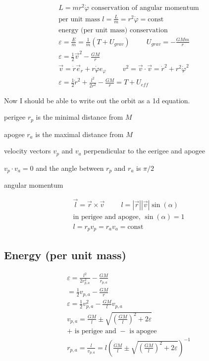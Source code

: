 \documentclass[fleqn]{report}
\newcommand{\hp}{\hspace{1cm}}
\newcommand{\const}{\textrm{const}}
\newcommand{\equations} [1] {
\begin{gather*}
#1
\end{gather*}
}
\begin{document}
\equations{
    L = m r^2 \dot \varphi \textrm{ conservation of angular momentum}
    \\
    \textrm{per unit mass } l = \frac{L}{m} = r^2 \dot \varphi = \const 
    \\
    \textrm{energy (per unit mass) conservation}
    \\
    \varepsilon = \frac{E}{m}
    =
    \frac{1}{m} (T + U_{grav})
    \hp 
    U_{grav} = - \frac{GMm}{r} 
    \\
    \varepsilon = \frac{1}{2} \vec v^2 - \frac{GM}{r}
    \\
    \vec v = \dot r \vec e_r + r \dot \varphi e_{\varphi}
    \hp 
    v^2 = \vec v \cdot \vec v = \dot r^2 + r^2 \dot \varphi^2
    \\
    \varepsilon = \frac{1}{2} \dot r^2 + \frac{l^2}{2r^2} - \frac{GM}{r}
    =
    T + U_{eff}
}

Now I should be able to write out the orbit as a 1d equation. 

perigee $r_p$ is the minimal distance from $M$

apogee $r_a$ is the maximal distance from $M$

velocity vectors $v_p$ and $v_a$ perpendicular to the eerigee and apogee 

$v_p \cdot v_a = 0$ and the angle between $r_p$ and $r_a$ is $\pi / 2$

angular momentum 
\equations{
    \vec l = \vec r \times \vec v \hp l = |\vec r| |\vec v| \sin(\alpha)
    \\
    \textrm{in perigee and apogee, $\sin(\alpha) = 1$}
    \\
    l = r_p v_p = r_a v_a = \const
}

\subsection{Energy (per unit mass)}
\equations{
    \varepsilon = \frac{l^2}{2 r_{p, a}^2} - \frac{GM}{r_{p, a}}
    \\
    = \frac{1}{2} v_{p, a} - \frac{GM}{r}
    \\
    \varepsilon = 
    \frac{1}{2} v_{p, a}^2 - \frac{GM}{l} v_{p, a}
    \\
    v_{p, a} = \frac{GM}{l} \pm \sqrt{\left(\frac{GM}{l}\right)^2 + 2 \varepsilon}
    \\
    \textrm{$+$ is perigee and $-$ is apogee}
    \\
    r_{p, a} = \frac{l}{v_{p, a}} = 
    l \left( \frac{GM}{l} \pm \sqrt{\left( \frac{GM}{l}\right)^2 + 2 \varepsilon}\right)^{-1}
}
\end{document}
